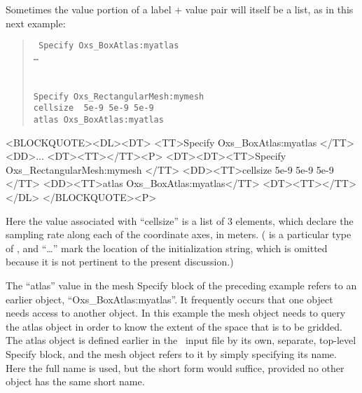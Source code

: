 Sometimes the value portion of a label + value pair will itself be a list,
as in this next example:
\begin{latexonly}
\begin{quote}\tt
Specify Oxs\_BoxAtlas:myatlas \ocb\\
\bi\bi\ldots\\
\ccb\\
\\
Specify Oxs\_RectangularMesh:mymesh \ocb \\
\bi cellsize \ocb\ 5e-9 5e-9 5e-9 \ccb\\
\bi atlas Oxs\_BoxAtlas:myatlas\\
\ccb
\end{quote}
\end{latexonly}
\begin{rawhtml}<BLOCKQUOTE><DL><DT>
<TT>Specify Oxs_BoxAtlas:myatlas {</TT>
<DD>...
<DT><TT>}</TT><P>
<DT><DT><TT>Specify Oxs_RectangularMesh:mymesh {</TT>
<DD><TT>cellsize { 5e-9 5e-9 5e-9 }</TT>
<DD><TT>atlas Oxs_BoxAtlas:myatlas</TT>
<DT><TT>}</TT></DL>
</BLOCKQUOTE><P>
\end{rawhtml}
Here the value associated with ``cellsize'' is a list of 3 elements,
which declare the sampling rate along each of the coordinate axes, in
meters.  ( is a particular type of ,
and ``\ldots'' mark the location of the 
initialization string, which is omitted because it is not pertinent to
the present discussion.)

%
\label{par:oxsExtReferencing}
The ``atlas'' value in the mesh Specify block of the preceding example
refers to an earlier  object, ``Oxs\_BoxAtlas:myatlas''.
It frequently occurs that one  object needs access to
another  object.  In this example the mesh object
 needs to query the atlas object  in order to
know the extent of the space that is to be gridded.  The atlas object is
defined earlier in the \MIF\ input file by its own, separate, top-level
Specify block, and the mesh object refers to it by simply specifying its
name.  Here the full name is used, but the short form 
would suffice, provided no other  object has the same short
name.

